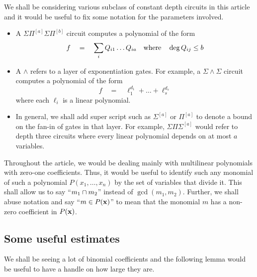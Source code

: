 \documentclass[12pt]{report}
\newcommand{\SPSPfanin}[2]{\Sigma\Pi^{[#1]}\Sigma\Pi^{[#2]}}
\begin{document}
We shall be considering various subclass of constant depth circuits in this article and it would be useful to fix some notation for the parameters involved. 
\begin{itemize}
\item A $\SPSPfanin{a}{b}$ circuit computes a polynomial of the form 
\[
f \quad = \quad \sum_i Q_{i1}\dots Q_{ia} \quad \text{where} \quad \deg Q_{ij} \leq b
\]
\item A $\wedge$ refers to a layer of exponentiation gates. For example, a $\Sigma\!\wedge\!\Sigma$ circuit computes a polynomial of the form 
\[
f \quad = \quad \ell_1^{d_1} + \dots + \ell_s^{d_s}
\]
where each $\ell_i$ is a linear polynomial. 
\item In general, we shall add super script such as $\Sigma^{[a]}$ or $\Pi^{[a]}$ to denote a bound on the fan-in of gates in that layer. For example, $\Sigma\Pi\Sigma^{[a]}$ would refer to depth three circuits where every linear polynomial depends on at most $a$ variables. 
\end{itemize}

Throughout the article, we would be dealing mainly with multilinear polynomials with zero-one coefficients. Thus, it would be useful to identify such any monomial of such a polynomial $P(x_1,\dots, x_n)$ by the set of variables that divide it. This shall allow us to say ``$m_1 \cap m_2$'' instead of $\gcd(m_1,m_2)$. Further, we shall abuse notation and say ``$m\in P(\mathbf{x})$'' to mean that the monomial $m$ has a non-zero coefficient in $P(\mathbf{x})$. 

\subsection{Some useful estimates}

We shall be seeing a lot of binomial coefficients and the following lemma would be useful to have a handle on how large they are. 
\end{document}
